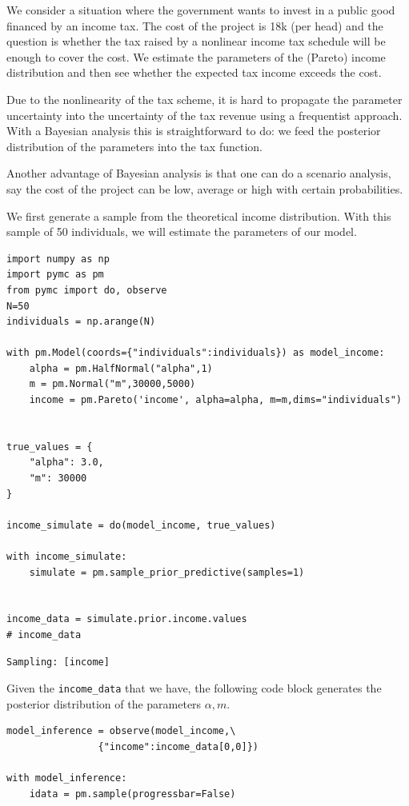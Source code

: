 \documentclass[11pt]{article}
\author{Jan Boone}
\date{\today}
\title{}
\begin{document}
We consider a situation where the government wants to invest in a public good financed by an income tax. The cost of the project is 18k (per head) and the question is whether the tax raised by a nonlinear income tax schedule will be enough to cover the cost. We estimate the parameters of the (Pareto) income distribution and then see whether the expected tax income exceeds the cost.

Due to the nonlinearity of the tax scheme, it is hard to propagate the parameter uncertainty into the uncertainty of the tax revenue using a frequentist approach. With a Bayesian analysis this is straightforward to do: we feed the posterior distribution of the parameters into the tax function.

Another advantage of Bayesian analysis is that one can do a scenario analysis, say the cost of the project can be low, average or high with certain probabilities.

We first generate a sample from the theoretical income distribution. With this sample of 50 individuals, we will estimate the parameters of our model.


\begin{verbatim}
import numpy as np
import pymc as pm
from pymc import do, observe
N=50
individuals = np.arange(N)

with pm.Model(coords={"individuals":individuals}) as model_income:
    alpha = pm.HalfNormal("alpha",1)
    m = pm.Normal("m",30000,5000)
    income = pm.Pareto('income', alpha=alpha, m=m,dims="individuals")


true_values = {
    "alpha": 3.0,
    "m": 30000
}

income_simulate = do(model_income, true_values)

with income_simulate:
    simulate = pm.sample_prior_predictive(samples=1)


income_data = simulate.prior.income.values
# income_data
\end{verbatim}

\label{}
\begin{verbatim}
Sampling: [income]
\end{verbatim}



Given the \texttt{income\_data}  that we have, the following code block generates the posterior distribution of the parameters \(\alpha,m\).

\begin{verbatim}
model_inference = observe(model_income,\
                {"income":income_data[0,0]})

with model_inference:
    idata = pm.sample(progressbar=False)

\end{verbatim}
\end{document}

